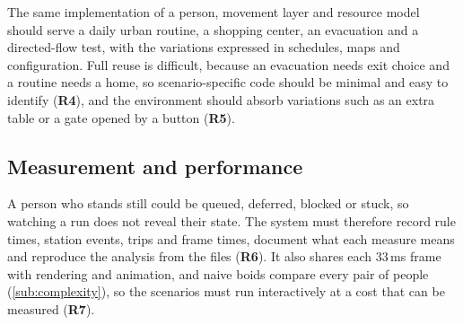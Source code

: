 The same implementation of a person, movement layer and resource model should serve a daily urban routine, a shopping center, an evacuation and a directed-flow test, with the variations expressed in schedules, maps and configuration. Full reuse is difficult, because an evacuation needs exit choice and a routine needs a home, so scenario-specific code should be minimal and easy to identify (\textbf{R4}), and the environment should absorb variations such as an extra table or a gate opened by a button (\textbf{R5}).

\subsection{Measurement and performance}\label{sub:challenge-measurement}\label{sub:challenge-performance}

A person who stands still could be queued, deferred, blocked or stuck, so watching a run does not reveal their state. The system must therefore record rule times, station events, trips and frame times, document what each measure means and reproduce the analysis from the files (\textbf{R6}). It also shares each 33\,ms frame with rendering and animation, and naive boids compare every pair of people (\cref{sub:complexity}), so the scenarios must run interactively at a cost that can be measured (\textbf{R7}).
